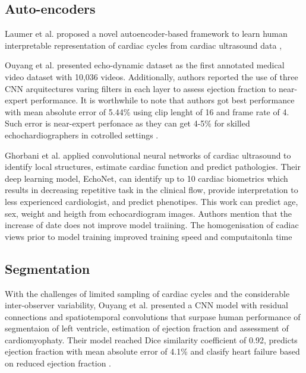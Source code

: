 \subsection{Auto-encoders}
Laumer et al. proposed a novel autoencoder-based framework to learn human interpretable representation of cardiac cycles from cardiac ultrasound data \cite{laumer2020},

Ouyang et al. presented echo-dynamic dataset as the first annotated medical video dataset with 10,036 videos. 
Additionally, authors reported the use of three CNN arquitectures varing filters in each layer to assess ejection fraction to near-expert performance.
It is worthwhile to note that authors got best performance with mean absolute error of 5.44\% using clip lenght of 16 and frame rate of 4.
Such error is near-expert perfonace as they can get 4-5\% for skilled echochardiographers in cotrolled settings \cite{ouyang-NeuripsML4H2019}.


Ghorbani et al. applied convolutional neural networks of cardiac ultrasound to identify local structures, estimate cardiac function and predict pathologies.
Their deep learning model, EchoNet, can identify up to 10 cardiac biometrics which results in decreasing repetitive task in the clinical flow, provide interpretation to less experienced cardiologist, and predict phenotipes. This work can predict age, sex, weight and heigth from echocardiogram images. 
Authors mention that the increase of date does not improve model traiining. The homogenisation of cadiac views prior to model training improved training speed and computaitonla time \cite{Ghorbani-DigitalMedicineNature-JAN2020}


\subsection{Segmentation}
With the challenges of limited sampling of cardiac cycles and the considerable inter-observer variability, Ouyang et al. presented a CNN model with residual connections and spatiotemporal convolutions that surpase human performance of segmentaion of left ventricle, estimation of ejection fraction and assessment of cardiomyophaty. 
Their model reached Dice similarity coefficient of 0.92, predicts ejection fraction with mean absolute error of 4.1\% and clasify heart failure based on reduced ejection fraction 
\cite{Ouyang-Nature-APR2020}.


